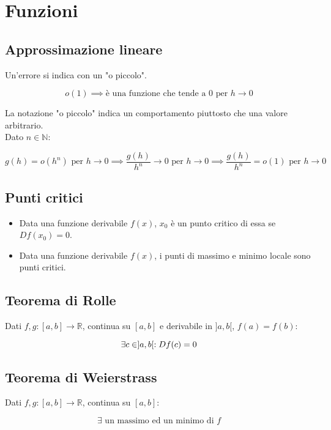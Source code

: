 \documentclass{article}
\begin{document}
\section{Funzioni}

\subsection{Approssimazione lineare}

Un'errore si indica con un "o piccolo".

$$
o(1) \implies \text{è una funzione che tende a 0 per } h \to 0
$$

\noindent
La notazione "o piccolo" indica un comportamento piuttosto che una valore arbitrario.\\

\noindent
Dato $n \in \mathbb{N}$:

$$
g(h) = o(h^n) \text{ per } h \to 0 \implies
\frac{g(h)}{h^n} \to 0 \text{ per } h \to 0 \implies
\frac{g(h)}{h^n} = o(1) \text{ per } h \to 0
$$

\subsection{Punti critici}

\begin{itemize}
    \item Data una funzione derivabile $f(x)$, $x_0$ è un punto critico di essa se $Df(x_0) = 0$.
    \item Data una funzione derivabile $f(x)$, i punti di massimo e minimo locale sono punti critici.
\end{itemize}

\subsection{Teorema di Rolle}

Dati $f,g : [a,b] \to \mathbb{R}$, continua su $[a,b]$ e derivabile in $]a,b[$,  $f(a) = f(b)$:

$$
\exists \space c \in \space ]a,b[ \space : Df(c) = 0
$$

\subsection{Teorema di Weierstrass}

Dati $f,g : [a,b] \to \mathbb{R}$, continua su $[a,b]$:

$$
\exists \text{ un massimo ed un minimo di }f
$$
\end{document}
